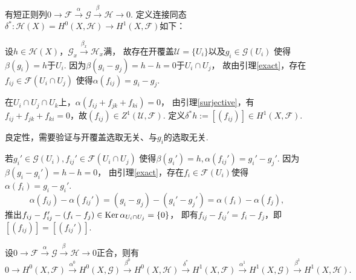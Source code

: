 \begin{definition}
    有短正则列$0\longrightarrow \mathscr{F} \stackrel{\alpha}{\longrightarrow} \mathscr{G} 
    \stackrel{\beta}{\longrightarrow} \mathscr{H}\longrightarrow 0$. 
    定义连接同态$\delta^*\colon \mathscr{H}(X)=H^0(X,\mathscr{H})
    \rightarrow H^1(X,\mathscr{F})$如下：
			
	设$h\in \mathscr{H}(X)$，$\mathscr{G}_x\stackrel{\beta_x}{\longrightarrow} \mathscr{H}_x$满，
    故存在开覆盖$\mathscr{U}=\{U_i\}$以及$g_i\in \mathscr{G}(U_i)$
    使得$\beta(g_i)=h$于$U_i$. 因为$\beta(g_i-g_j)=h-h=0$于$U_i\cap U_j$，
    故由引理\ref{exact}，存在$f_{ij}\in \mathscr{F}(U_i\cap U_j)$
    使得$\alpha(f_{ij})=g_i-g_j$.

	在$U_i\cap U_j\cap U_k$上，$\alpha(f_{ij}+f_{jk}+f_{ki})=0$，
    由引理\ref{surjective}，有$f_{ij}+f_{jk}+f_{ki}=0$，故$(f_{ij})\in Z^1(\mathscr{U},\mathscr{F})$. 
    定义$\delta^* h:=[(f_{ij})]\in H^1(X,\mathscr{F})$.

	良定性，需要验证与开覆盖选取无关、与$g_i$的选取无关.

	若$g_i'\in \mathscr{G}(U_i), f_{ij}'\in \mathscr{F}(U_i\cap U_j)$
    使得$\beta(g_i')=h, \alpha(f_{ij}')=g_i'-g_j'$. 
    因为$\beta(g_i-g_i')=h-h=0$，
    由引理\ref{exact}，存在$f_i\in \mathscr{F}(U_i)$使得$\alpha(f_i)=g_i-g_i'$.
	$$\alpha(f_{ij})-\alpha(f_{ij}')
    =(g_i-g_j)-(g_i'-g_j')=\alpha(f_i)-\alpha(f_j),$$
	推出$f_{ij}-f_{ij}'-(f_i-f_j)\in \operatorname{Ker}\alpha_{U_i\cap U_j}=\{0\}$，
    即有$f_{ij}-f_{ij}'=f_i-f_j$，即$[(f_{ij})]=[(f_{ij}')]$.
\end{definition}

\begin{theorem}
    设$0\longrightarrow \mathscr{F}\stackrel{\alpha}{\longrightarrow} \mathscr{G} 
    \stackrel{\beta}{\longrightarrow} \mathscr{H}\rightarrow 0$正合，则有
	$$0\longrightarrow H^0(X,\mathscr{F})\stackrel{\alpha^0}{\longrightarrow} H^0(X,\mathscr{G})
    \stackrel{\beta^0}{\longrightarrow} H^0(X,\mathscr{H})
    \stackrel{\delta^*}{\longrightarrow} H^1(X,\mathscr{F})
    \stackrel{\alpha^1}{\longrightarrow} H^1(X,\mathscr{G})
    \stackrel{\beta^1}{\longrightarrow} H^1(X,\mathscr{H}).$$
\end{theorem}

